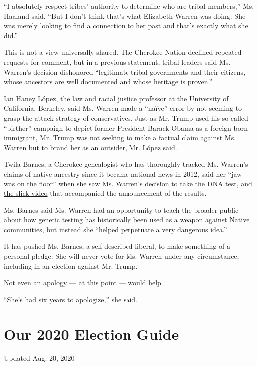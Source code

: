 ``I absolutely respect tribes' authority to determine who are tribal
members,'' Ms. Haaland said. ``But I don't think that's what Elizabeth
Warren was doing. She was merely looking to find a connection to her
past and that's exactly what she did.''

This is not a view universally shared. The Cherokee Nation declined
repeated requests for comment, but in a previous statement, tribal
leaders said Ms. Warren's decision dishonored ``legitimate tribal
governments and their citizens, whose ancestors are well documented and
whose heritage is proven.''

Ian Haney López, the law and racial justice professor at the University
of California, Berkeley, said Ms. Warren made a ``naïve'' error by not
seeming to grasp the attack strategy of conservatives. Just as Mr. Trump
used his so-called ``birther'' campaign to depict former President
Barack Obama as a foreign-born immigrant, Mr. Trump was not seeking to
make a factual claim against Ms. Warren but to brand her as an outsider,
Mr. López said.

Twila Barnes, a Cherokee genealogist who has thoroughly tracked Ms.
Warren's claims of native ancestry since it became national news in
2012, said her ``jaw was on the floor'' when she saw Ms. Warren's
decision to take the DNA test, and
\href{https://www.youtube.com/watch?v=RHzbdZuVyAM}{the slick video} that
accompanied the announcement of the results.

Ms. Barnes said Ms. Warren had an opportunity to teach the broader
public about how genetic testing has historically been used as a weapon
against Native communities, but instead she ``helped perpetuate a very
dangerous idea.''

It has pushed Ms. Barnes, a self-described liberal, to make something of
a personal pledge: She will never vote for Ms. Warren under any
circumstance, including in an election against Mr. Trump.

Not even an apology --- at this point --- would help.

``She's had six years to apologize,'' she said.

\hypertarget{our-2020-election-guide}{%
\section{Our 2020 Election Guide}\label{our-2020-election-guide}}

Updated Aug. 20, 2020

